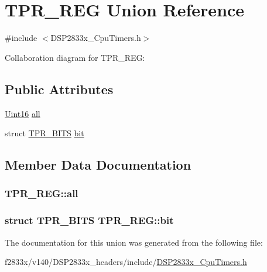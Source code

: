 \hypertarget{union_t_p_r___r_e_g}{}\section{T\+P\+R\+\_\+\+R\+E\+G Union Reference}
\label{union_t_p_r___r_e_g}


{\ttfamily \#include $<$D\+S\+P2833x\+\_\+\+Cpu\+Timers.\+h$>$}



Collaboration diagram for T\+P\+R\+\_\+\+R\+E\+G\+:
\subsection*{Public Attributes}
\begin{DoxyCompactItemize}
\item 
\hyperlink{_d_s_p2833x___device_8h_a59a9f6be4562c327cbfb4f7e8e18f08b}{Uint16} \hyperlink{union_t_p_r___r_e_g_abd822dadd5ecc54127a600d249800532}{all}
\item 
struct \hyperlink{struct_t_p_r___b_i_t_s}{T\+P\+R\+\_\+\+B\+I\+T\+S} \hyperlink{union_t_p_r___r_e_g_a9ff731b75daaf657eb45eba7e651651a}{bit}
\end{DoxyCompactItemize}


\subsection{Member Data Documentation}
\hypertarget{union_t_p_r___r_e_g_abd822dadd5ecc54127a600d249800532}{}
\subsubsection[{all}]{ T\+P\+R\+\_\+\+R\+E\+G\+::all}\label{union_t_p_r___r_e_g_abd822dadd5ecc54127a600d249800532}
\hypertarget{union_t_p_r___r_e_g_a9ff731b75daaf657eb45eba7e651651a}{}
\subsubsection[{bit}]{\setlength{\rightskip}{0pt plus 5cm}struct {\bf T\+P\+R\+\_\+\+B\+I\+T\+S} T\+P\+R\+\_\+\+R\+E\+G\+::bit}\label{union_t_p_r___r_e_g_a9ff731b75daaf657eb45eba7e651651a}


The documentation for this union was generated from the following file\+:\begin{DoxyCompactItemize}
\item 
f2833x/v140/\+D\+S\+P2833x\+\_\+headers/include/\hyperlink{_d_s_p2833x___cpu_timers_8h}{D\+S\+P2833x\+\_\+\+Cpu\+Timers.\+h}\end{DoxyCompactItemize}
